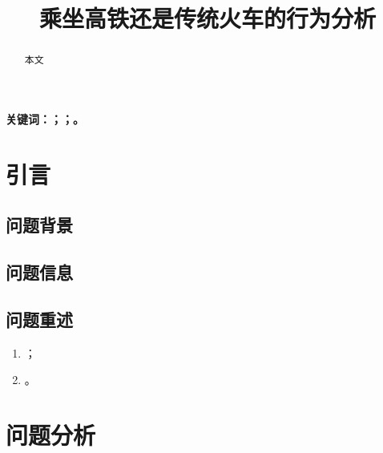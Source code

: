 \documentclass{ctexart}
\newcounter{sub}
\begin{document}

\title{\textbf{乘坐高铁还是传统火车的行为分析}}
\author{}
\date{}
\maketitle

\renewcommand{\abstractname}{\Large 摘要}
\begin{abstract}
	本文
\end{abstract}

\textbf{关键词：；；。}

\newpage



\tableofcontents

\newpage

\listoffigures

\newpage

\listoftables

\newpage

\setcounter{section}{-1}


\section{引言}%
\label{sec:引言}

\subsection{问题背景}%
\label{sub:问题背景}

\subsection{问题信息}%
\label{sub:问题信息}

\subsection{问题重述}%
\label{sub:问题重述}



\begin{enumerate}
	\item ；
	\item 。
\end{enumerate}

\newpage

\section{问题分析}%
\label{sec:问题分析}
\end{document}
